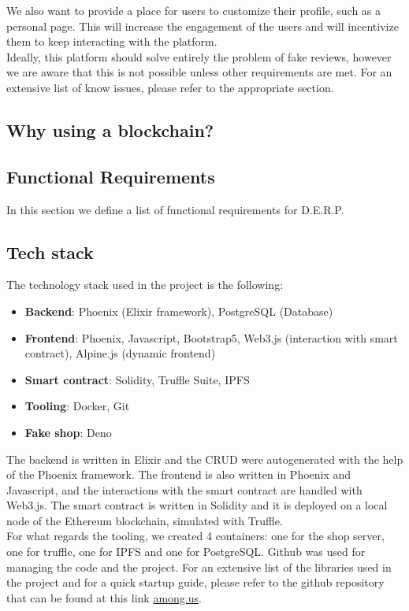 \documentclass[12pt,a4paper,oneside]{article}
\theoremstyle{definition}
\begin{document}
We also want to provide a place for users to customize their profile, such as a personal page. This will increase the engagement of the users and will incentivize them to keep interacting with the platform. \\
Ideally, this platform should solve entirely the problem of fake reviews, however we are aware that this is not possible unless other requirements are met. For an extensive list of know issues, please refer to the appropriate section. 

\subsection{Why using a blockchain?}

\subsection{Functional Requirements}

In this section we define a list of functional requirements for D.E.R.P.

\subsection{Tech stack}

The technology stack used in the project is the following:
\begin{itemize}
	\item \textbf{Backend}: Phoenix (Elixir framework), PostgreSQL (Database)
	\item \textbf{Frontend}: Phoenix, Javascript, Bootstrap5, Web3.js (interaction with smart contract), Alpine.js (dynamic frontend)
	\item \textbf{Smart contract}: Solidity, Truffle Suite, IPFS
	\item \textbf{Tooling}: Docker, Git
	\item \textbf{Fake shop}: Deno
\end{itemize}

The backend is written in Elixir and the CRUD were autogenerated with the help of the Phoenix framework. The frontend is also written in Phoenix and Javascript, and the interactions with the smart contract are handled with Web3.js. The smart contract is written in Solidity and it is deployed on a local node of the Ethereum blockchain, simulated with Truffle. \\
For what regards the tooling, we created 4 containers: one for the shop server, one for truffle, one for IPFS and one for PostgreSQL. Github was used for managing the code and the project.
For an extensive list of the libraries used in the project and for a quick startup guide, please refer to the github repository that can be found at this link \url{among.us}.
\end{document}
